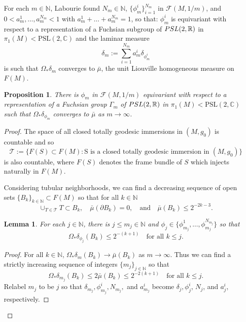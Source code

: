 \documentclass[11pt]{amsart}
\def\R{\mathbb R}
\def\N{\mathbb N}
\def\C{\mathbb C}
\newtheorem{lemm}[thm]{Lemma}
\newtheorem{prop}[thm]{Proposition}
\theoremstyle{remark}
\theoremstyle{definition}
\begin{document}
{{	For each $m\in\N$, Labourie \cite[Theorem 5.7]{Labourie}  found $N_m\in\N$, $\{\phi^i_m\}_{i=1}^{N_m}$ in  $\mathcal F(M,1/m)$, and $ 0<a_m^1,\ldots,a_m^{N_m}<1$ with $a_m^1+\ldots+a_m^{N_m} =1$, so that:  
	$\phi^i_m$ is equivariant  with respect to a representation of a Fuchsian subgroup  of ${\rm PSL}(2,\R)$ in $\pi_1(M)<\text{PSL}(2,\C)$ and 
	the  laminar measure 
	\begin{equation}\label{measure.laminar}
		\delta_m:=\sum_{i=1}^{N_m}a^i_m\delta_{\phi^i_m}
	\end{equation} is such that
	$\Omega_*\delta_{m}$ converges to  $\bar\mu$, the unit {Liouville} homogeneous measure on $F(M)$.
	
	\begin{prop}\label{connected}
		There is $\phi_m$ in  $\mathcal F(M,1/m)$ equivariant  with respect to a representation of a Fuchsian group $\Gamma_m$  of ${\rm PSL}(2,\R)$ in $\pi_1(M)<\text{PSL}(2,\C)$ such that  $\Omega_*\delta_{\phi_m}$ converges to  ${\bar\mu}$ as $m\to\infty$.
	\end{prop}
	\begin{proof}
		The space of all closed totally geodesic immersions in $(M,g_0)$ is countable and so 
		$$\mathcal T:=\{F(S)\subset F(M):\mbox{S is a closed totally geodesic immersion in }(M,g_0)\} $$
		is also countable, where $F(S)$ denotes the frame bundle of $S$ which injects naturally in $F(M)$.
		
		Considering tubular neighborhoods, we can find a decreasing sequence of open sets $\{B_k\}_{k\in\N}\subset F(M)$ so that for all $k\in\N$
		$$\cup_{T\in\mathcal T}T\subset B_k,\quad {\bar\mu}(\partial B_k)=0,\quad\mbox{and}\quad{\bar\mu}(B_k)\leq 2^{-2k-3}.$$ 
		\begin{lemm}\label{b.is.sero} For each $j\in\N$, there is $j\leq m_j\in\N$  and $\phi_j\in \{\phi^1_{m_j},\ldots,\phi^{N_{m_j}}_{m_j}\}$ so that 
			$$\Omega_*\delta_{\phi_j}(B_k)\leq 2^{-(k+1)}\quad\mbox{for all }k\leq j.$$
		\end{lemm} 
		\begin{proof}
			For all $k\in\N$, $\Omega_*\delta_m(B_k)\to{\bar\mu}(B_k)$ as $m\to\infty$. Thus we can find a strictly increasing sequence of integers $\{m_j\}_{j\in\N}$ so that
			\begin{equation}\label{connected1}
				\Omega_*\delta_{m_j}(B_k)\leq 2{\bar\mu}(B_k)\leq 2^{-2(k+1)}\quad\mbox{for all }k\leq j.
			\end{equation}
			Relabel $m_j$ to be $j$ so that $\delta_{m_j}, \phi^i_{m_j}, N_{m_j},$ and $a^i_{m_j}$  become $\delta_j, \phi^i_j$, $N_{j}$, and $a^i_{j}$, respectively.
			

\end{proof}
\end{proof}}}
\end{document}
